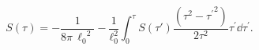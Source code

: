 \begin{equation}\label{rw5d}
S(\tau)=-\dfrac{1}{8\pi\,{\ell_{0}}^{\!\!2}}-\dfrac{1}{\ell_{0}^{2}}
\int_{0}^{\tau} S(\tau')\dfrac{(\tau ^{2}-{\tau^{\prime}}^{2})}{2
\tau^{2}}\tau^{\prime}\dd {\tau^{\prime}}.
\end{equation}


